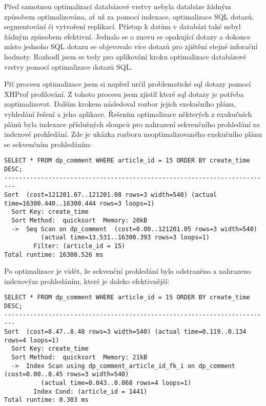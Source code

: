 \documentclass[12pt]{article}
\begin{document}
Před samotnou optimalizací databázové vrstvy nebyla databáze žádným způsobem optimalizována, ať už za pomocí indexace, optimalizace SQL dotazů, segmentování či vytvoření replikací. Přístup k datům v databázi také nebyl žádným způsobem efektivní. Jednalo se o znovu se opakující dotazy a dokonce místo jednoho SQL dotazu se objevovalo více dotazů pro zjištění stejné inforační hodnoty. Rozhodl jsem se tedy pro aplikování kroku optimalizace databázové vrstvy pomocí optimalizace dotazů SQL.

Pří procesu optimalizace jsem si napřed určil problematické sql dotazy pomocí XHProf profilování. Z tohoto procesu jsem zjistil které sql dotazy je potřeba zoptimalizovat. Dalším krokem následoval rozbor jejich exekučního plánu, vyhledání řešení a jeho aplikace. Řešením optimalizace některých z exukučních plánů byla indexace příslušných sloupců pro nahrazení sekvenčního prohledání za indexové prohledání. Zde je ukázka rozboru neoptimalizovaného exekučního plánu se sekvenčním prohledáním:

\begin{scriptsize}
\begin{verbatim}
SELECT * FROM dp_comment WHERE article_id = 15 ORDER BY create_time DESC;
-------------------------------------------------------------------------
Sort  (cost=121201.07..121201.08 rows=3 width=540) (actual time=16300.440..16300.444 rows=3 loops=1)
  Sort Key: create_time
  Sort Method:  quicksort  Memory: 20kB
  ->  Seq Scan on dp_comment  (cost=0.00..121201.05 rows=3 width=540) 
          (actual time=13.531..16300.393 rows=3 loops=1)
        Filter: (article_id = 15)
Total runtime: 16300.526 ms
\end{verbatim}
\end{scriptsize}

Po optimalizace je vidět, že sekvenční prohledání bylo odstraněno a nahrazeno indexovým prohledáním, které je daleko efektivnější:

\clearpage
\begin{scriptsize}
\begin{verbatim}
SELECT * FROM dp_comment WHERE article_id = 15 ORDER BY create_time DESC;
-------------------------------------------------------------------------
Sort  (cost=8.47..8.48 rows=3 width=540) (actual time=0.119..0.134 rows=4 loops=1)
  Sort Key: create_time
  Sort Method:  quicksort  Memory: 21kB
  ->  Index Scan using dp_comment_article_id_fk_i on dp_comment  (cost=0.00..8.45 rows=3 width=540) 
          (actual time=0.043..0.068 rows=4 loops=1)
        Index Cond: (article_id = 1441)
Total runtime: 0.303 ms
\end{verbatim}
\end{scriptsize}
\end{document}
